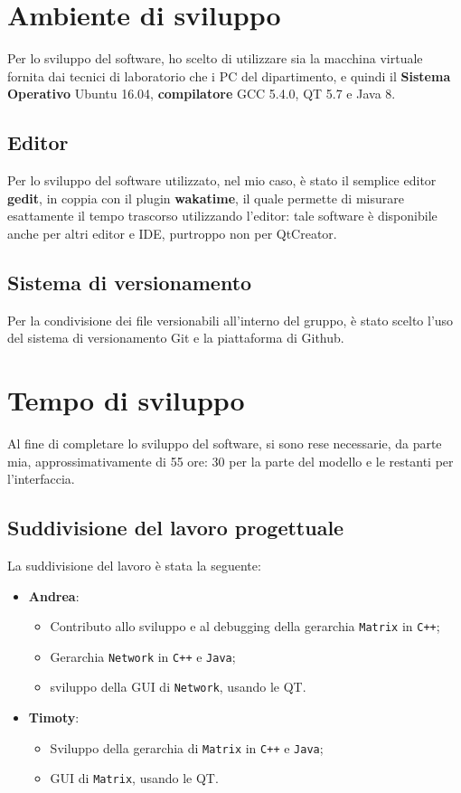    
\section{Ambiente di sviluppo}
Per lo sviluppo del software, ho scelto di utilizzare sia la macchina virtuale fornita dai tecnici di
laboratorio che i PC del dipartimento, e quindi il \textbf{Sistema Operativo} Ubuntu 16.04, \textbf{compilatore}
GCC 5.4.0, QT 5.7 e Java 8.

\subsection{Editor}
Per lo sviluppo del software utilizzato, nel mio caso, è stato il semplice editor \textbf{gedit}, in coppia con 
il plugin \textbf{wakatime}, il quale permette di misurare esattamente il tempo trascorso utilizzando l'editor:
tale software è disponibile anche per altri editor e IDE, purtroppo non per QtCreator.

\subsection{Sistema di versionamento}
Per la condivisione dei file versionabili all'interno del gruppo, è stato scelto l'uso del sistema di versionamento
Git e la piattaforma di Github.

\section{Tempo di sviluppo} 
Al fine di completare lo sviluppo del software, si sono rese necessarie, da parte mia, approssimativamente di 55 ore:
30 per la parte del modello e le restanti per l'interfaccia.
 

\subsection{Suddivisione del lavoro progettuale}
La suddivisione del lavoro è stata la seguente:
\begin{itemize}
    \item \textbf{Andrea}:
    \begin{itemize}
        \item Contributo allo sviluppo e al debugging della gerarchia \texttt{Matrix} in \texttt{C++};
        \item Gerarchia \texttt{Network} in \texttt{C++} e \texttt{Java};
        \item sviluppo della GUI di \texttt{Network}, usando le QT.
    \end{itemize}
    \item \textbf{Timoty}:
    \begin{itemize}
        \item Sviluppo della gerarchia di \texttt{Matrix} in \texttt{C++} e \texttt{Java};
        \item GUI di \texttt{Matrix}, usando le QT.
    \end{itemize}
\end{itemize}


